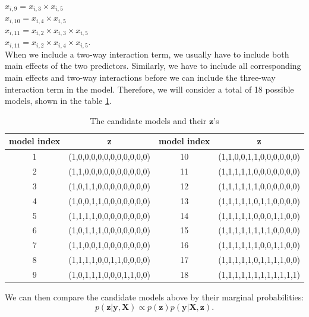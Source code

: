 \documentclass[a4page]{article}
\begin{document}
	$x_{i,9}=x_{i,3}\times x_{i,5}$\\
	$x_{i,10}=x_{i,4}\times x_{i,5}$\\
	$x_{i,11}=x_{i,2}\times x_{i,3}\times x_{i,5}$\\
	$x_{i,11}=x_{i,2}\times x_{i,4}\times x_{i,5}$.\\
	When we include a two-way interaction term, we usually have to include both main effects of the two predictors. Similarly, we have to include all corresponding main effects and two-way interactions before we can include the three-way interaction term in the model. Therefore, we will consider a total of 18 possible models, shown in the table \ref{table-z}.
    \begin{center}
        \begin{table}[H]
            \begin{tabular}{c|c||c|c}  
                model index&\textbf{z}&model index&\textbf{z}\\
                \hline
                1 & (1,0,0,0,0,0,0,0,0,0,0,0)&10&	(1,1,0,0,1,1,0,0,0,0,0,0)	\\ 
                2 & (1,1,0,0,0,0,0,0,0,0,0,0)&11&	(1,1,1,1,1,0,0,0,0,0,0,0)	\\
                3 & (1,0,1,1,0,0,0,0,0,0,0,0)&12&	(1,1,1,1,1,1,0,0,0,0,0,0)	\\
                4 & (1,0,0,1,1,0,0,0,0,0,0,0)&13&	(1,1,1,1,1,0,1,1,0,0,0,0)	\\
                5 & (1,1,1,1,0,0,0,0,0,0,0,0)&14&	(1,1,1,1,1,0,0,0,1,1,0,0)	\\
                6 &	(1,0,1,1,1,0,0,0,0,0,0,0)&15&	(1,1,1,1,1,1,1,1,0,0,0,0)	\\
                7 &	(1,1,0,0,1,0,0,0,0,0,0,0)&16&	(1,1,1,1,1,1,0,0,1,1,0,0)	\\
                8 &	(1,1,1,1,0,0,1,1,0,0,0,0)&17&	(1,1,1,1,1,0,1,1,1,1,0,0)	\\
                9 &	(1,0,1,1,1,0,0,0,1,1,0,0)&18&	(1,1,1,1,1,1,1,1,1,1,1,1)	\\	
            \end{tabular}
        \caption{The candidate models and their $\bm{z}$'s}
        \label{table-z}
        \end{table}
    \end{center}
	We can then compare the candidate models above by their marginal probabilities:
	\begin{equation}
	p(\bm{z}|\bm{y},\bm{X})\propto p(\bm{z})p(\bm{y}|\bm{X},\bm{z}).\label{marginalp1}
	\end{equation}
\end{document}
